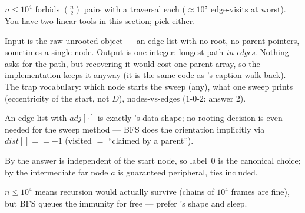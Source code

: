 \begin{attemptgate}
$n \le 10^4$ forbids $\binom{n}{2}$ pairs with a traversal each ($\approx 10^8$
edge-visits at worst). You have two linear tools in this section; pick either.
\end{attemptgate}

Input is the raw unrooted object --- an edge list with no root, no parent pointers,
sometimes a single node. Output is one integer: longest path \emph{in edges}. Nothing
asks for the path, but recovering it would cost one parent array, so the implementation
keeps it anyway (it is the same code as 's caption walk-back).
The trap vocabulary: which node starts the sweep (any), what one sweep prints
(eccentricity of the start, not $D$), nodes-vs-edges ($1$-$0$-$2$: answer $2$).

\begin{observation}
An edge list with $\mathit{adj}[\cdot]$ is exactly 's data shape;
no rooting decision is even needed for the sweep method --- BFS does the orientation
implicitly via $\mathit{dist}[] == -1$ (visited $=$ ``claimed by a parent'').
\end{observation}
\begin{observation}
By  the answer is independent of the start node, so label~$0$ is
the canonical choice; by  the intermediate far node $a$ is
guaranteed peripheral, ties included.
\end{observation}
\begin{observation}
$n \le 10^4$ means recursion would actually survive (chains of $10^4$ frames are fine),
but BFS queues the immunity for free --- prefer 's shape and sleep.
\end{observation}

